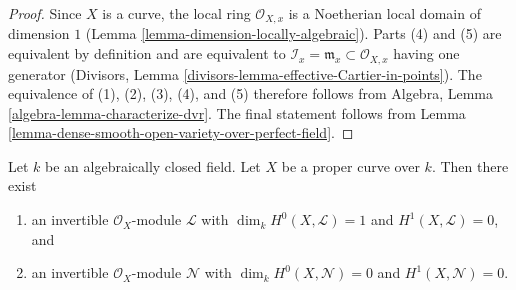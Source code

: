 \begin{proof}
Since $X$ is a curve, the local ring $\mathcal{O}_{X, x}$ is a Noetherian
local domain of dimension $1$ (Lemma \ref{lemma-dimension-locally-algebraic}).
Parts (4) and (5) are equivalent by definition and are equivalent to
$\mathcal{I}_x = \mathfrak m_x \subset \mathcal{O}_{X, x}$ having one generator
(Divisors, Lemma \ref{divisors-lemma-effective-Cartier-in-points}).
The equivalence of (1), (2), (3), (4), and (5) therefore follows from
Algebra, Lemma \ref{algebra-lemma-characterize-dvr}. The final statement
follows from Lemma \ref{lemma-dense-smooth-open-variety-over-perfect-field}.
\end{proof}

\begin{lemma}
\label{lemma-general-degree-g-line-bundle}
Let $k$ be an algebraically closed field. Let $X$ be a proper curve over $k$.
Then there exist
\begin{enumerate}
\item an invertible $\mathcal{O}_X$-module $\mathcal{L}$ with
$\dim_k H^0(X, \mathcal{L}) = 1$ and $H^1(X, \mathcal{L}) = 0$, and
\item an invertible $\mathcal{O}_X$-module $\mathcal{N}$ with
$\dim_k H^0(X, \mathcal{N}) = 0$ and $H^1(X, \mathcal{N}) = 0$.
\end{enumerate}
\end{lemma}


